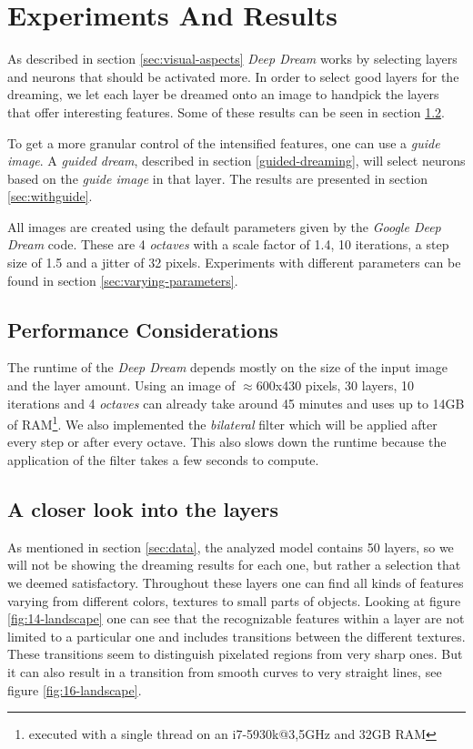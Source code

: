 \section{Experiments And Results}
\label{sec:evaluation}
As described in section \ref{sec:visual-aspects} \emph{Deep Dream} works by selecting layers and neurons that should be activated more.
In order to select good layers for the dreaming, we let each layer be dreamed onto an image to handpick the layers that offer interesting features.
Some of these results can be seen in section \ref{sec:withoutguide}.

To get a more granular control of the intensified features, one can use a \textit{guide image}.
A \textit{guided dream}, described in section \ref{guided-dreaming}, will select neurons based on the \textit{guide image} in that layer.
The results are presented in section \ref{sec:withguide}.

All images are created using the default parameters given by the \textit{Google Deep Dream} code.
These are 4 \textit{octaves} with a scale factor of 1.4, 10 iterations, a step size of 1.5 and a jitter of 32 pixels.
Experiments with different parameters can be found in section \ref{sec:varying-parameters}.


\subsection{Performance Considerations}
\label{sec:performance}
The runtime of the \textit{Deep Dream} depends mostly on the size of the input image and the layer amount.
Using an image of $\approx$600x430 pixels, 30 layers, 10 iterations and 4 \textit{octaves} can already take around 45 minutes and uses up to 14GB of RAM\footnote{executed with a single thread on an i7-5930k@3,5GHz and 32GB RAM}.
We also implemented the \textit{bilateral} filter which will be applied after every step or after every octave.\cite{bilateral}
This also slows down the runtime because the application of the filter takes a few seconds to compute.

\newpage
\subsection{A closer look into the layers}
\label{sec:withoutguide}

As mentioned in section \ref{sec:data}, the analyzed model contains 50 layers, so we will not be showing the dreaming results for each one, but rather a selection that we deemed satisfactory.
Throughout these layers one can find all kinds of features varying from different colors, textures to small parts of objects.
Looking at figure \ref{fig:14-landscape} one can see that the recognizable features within a layer are not limited to a particular one and includes transitions between the different textures.
These transitions seem to distinguish pixelated regions from very sharp ones.
But it can also result in a transition from smooth curves to very straight lines, see figure \ref{fig:16-landscape}.

